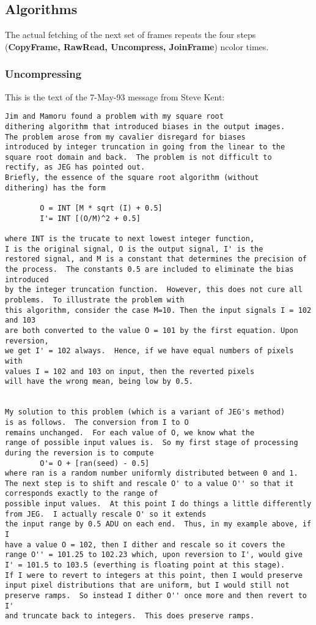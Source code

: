 \subsection{Algorithms}

The actual fetching of the next set of frames repeats the four steps
({\bf CopyFrame, RawRead, Uncompress, JoinFrame})
ncolor  times. 

\subsubsection{Uncompressing}

This is the text of the 7-May-93 message from Steve Kent:
\begin{verbatim}
Jim and Mamoru found a problem with my square root
dithering algorithm that introduced biases in the output images.
The problem arose from my cavalier disregard for biases
introduced by integer truncation in going from the linear to the
square root domain and back.  The problem is not difficult to
rectify, as JEG has pointed out.
Briefly, the essence of the square root algorithm (without
dithering) has the form

		O = INT [M * sqrt (I) + 0.5]
		I'= INT [(O/M)^2 + 0.5]

where INT is the trucate to next lowest integer function,
I is the original signal, O is the output signal, I' is the
restored signal, and M is a constant that determines the precision of
the process.  The constants 0.5 are included to eliminate the bias introduced
by the integer truncation function.  However, this does not cure all
problems.  To illustrate the problem with
this algorithm, consider the case M=10. Then the input signals I = 102 and 103
are both converted to the value O = 101 by the first equation. Upon reversion,
we get I' = 102 always.  Hence, if we have equal numbers of pixels with
values I = 102 and 103 on input, then the reverted pixels
will have the wrong mean, being low by 0.5.


My solution to this problem (which is a variant of JEG's method)
is as follows.  The conversion from I to O
remains unchanged.  For each value of O, we know what the
range of possible input values is.  So my first stage of processing
during the reversion is to compute
		O'= O + [ran(seed) - 0.5]
where ran is a random number uniformly distributed between 0 and 1.
The next step is to shift and rescale O' to a value O'' so that it
corresponds exactly to the range of
possible input values.  At this point I do things a little differently
from JEG.  I actually rescale O' so it extends
the input range by 0.5 ADU on each end.  Thus, in my example above, if I
have a value O = 102, then I dither and rescale so it covers the
range O'' = 101.25 to 102.23 which, upon reversion to I', would give
I' = 101.5 to 103.5 (everthing is floating point at this stage).
If I were to revert to integers at this point, then I would preserve
input pixel distributions that are uniform, but I would still not
preserve ramps.  So instead I dither O'' once more and then revert to I'
and truncate back to integers.  This does preserve ramps.


\end{verbatim}
